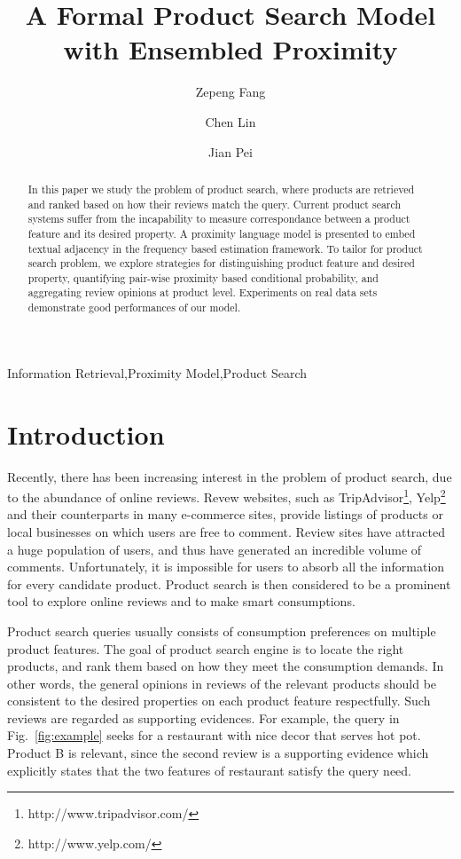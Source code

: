 \documentclass[preprint]{elsarticle}
\begin{document}
\begin{frontmatter}

\title{A Formal Product Search Model with Ensembled Proximity}


\author{Zepeng Fang}
\author{Chen Lin}
\author{Jian Pei}
\address{Department of Computer Science, Xiamen University, 422 Siming South Road, Xiamen, Fujian, China}

\begin{abstract}
In this paper we study the problem of product search, where products are retrieved and ranked based on how their reviews match the query. Current product search systems suffer from the incapability to measure correspondance between a product feature and its desired property. A proximity language model is presented to embed textual adjacency in the frequency based estimation framework. To tailor for product search problem, we explore strategies for distinguishing product feature and desired property, quantifying pair-wise proximity based conditional probability, and aggregating review opinions at product level. Experiments on real data sets demonstrate good performances of our model. 
\end{abstract}

\begin{keyword}
Information Retrieval\sep Proximity Model\sep Product Search 
\end{keyword}

\end{frontmatter}


\section{Introduction}\label{sec:introduction}
Recently, there has been increasing interest in the problem of product search, due to the abundance of online reviews. Revew websites, such as TripAdvisor\footnote{http://www.tripadvisor.com/}, Yelp\footnote{http://www.yelp.com/} and their counterparts in many e-commerce sites, provide listings of products or local businesses on which users are free to comment. Review sites have attracted a huge population of users, and thus have generated an incredible volume of comments. Unfortunately, it is impossible for users to absorb all the information for every candidate product. Product search is then considered to be a prominent tool to explore online reviews and to make smart consumptions.

Product search queries usually consists of consumption preferences on multiple product features. The goal of product search engine is to locate the right products, and rank them based on how they meet the consumption demands. In other words, the general opinions in reviews of the relevant products should be consistent to the desired properties on each product feature respectfully. Such reviews are regarded as supporting evidences. For example, the query in Fig.~\ref{fig:example} seeks for a restaurant with nice decor that serves hot pot. Product B is relevant, since the second review is a supporting evidence which explicitly states that the two features of restaurant satisfy the query need.
\end{document}
